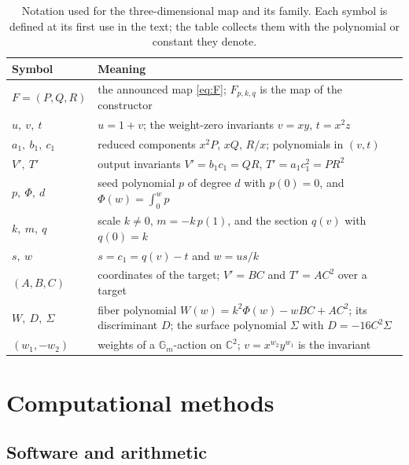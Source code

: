\documentclass[11pt]{article}
\theoremstyle{definition}
\theoremstyle{remark}
\newcommand{\C}{\mathbb{C}}
\newcommand{\Gm}{\mathbb{G}_m}
\begin{document}
\begin{table}[t]\centering\small
\begin{tabular}{p{}p{}}
\toprule
Symbol & Meaning \\
\midrule
$F = (P,Q,R)$ & the announced map \eqref{eq:F}; $F_{p,k,q}$ is the map of the constructor \\
$u,\ v,\ t$ & $u = 1 + v$; the weight-zero invariants $v = xy$, $t = x^2 z$ \\
$a_1,\ b_1,\ c_1$ & reduced components $x^2 P$, $xQ$, $R/x$; polynomials in $(v,t)$ \\
$V',\ T'$ & output invariants $V' = b_1 c_1 = QR$, $T' = a_1 c_1^2 = PR^2$ \\
$p,\ \Phi,\ d$ & seed polynomial $p$ of degree $d$ with $p(0)=0$, and $\Phi(w) = \int_0^w p$ \\
$k,\ m,\ q$ & scale $k \neq 0$, $m = -k\,p(1)$, and the section $q(v)$ with $q(0) = k$ \\
$s,\ w$ & $s = c_1 = q(v) - t$ and $w = u s / k$ \\
$(A,B,C)$ & coordinates of the target; $V' = BC$ and $T' = AC^2$ over a target \\
$W,\ D,\ \Sigma$ & fiber polynomial $W(w) = k^2\Phi(w) - wBC + AC^2$; its discriminant $D$; the surface polynomial $\Sigma$ with $D = -16 C^2 \Sigma$ \\
$(w_1, -w_2)$ & weights of a $\Gm$-action on $\C^2$; $v = x^{w_2}y^{w_1}$ is the invariant \\
\bottomrule
\end{tabular}
\caption{Notation used for the three-dimensional map and its family. Each symbol is defined at its first use in the text; the table collects them with the polynomial or constant they denote.}
\label{tab:notation}
\end{table}

\section{Computational methods}\label{sec:methods}

\subsection{Software and arithmetic}
\end{document}
